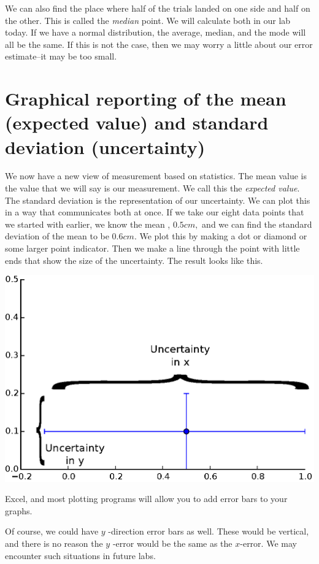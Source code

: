 \documentclass{book}%
\begin{document}
We can also find the place where half of the trials landed on one side and
half on the other. This is called the \emph{median} point. We will calculate
both in our lab today. If we have a normal distribution, the average,
median, and the mode will all be the same. If this is not the case, then we
may worry a little about our error estimate--it may be too small.

\section{Graphical reporting of the mean (expected value) and standard
deviation (uncertainty)}

We now have a new view of measurement based on statistics. The mean value is
the value that we will say is our measurement. We call this the \emph{%
expected value}. The standard deviation is the representation of our
uncertainty. We can plot this in a way that communicates both at once. If we
take our eight data points that we started with earlier, we know the mean , $%
0.5\unit{cm},$ and we can find the standard deviation of the mean to be $0.6%
\unit{cm}.$ We plot this by making a dot or diamond or some larger point
indicator. Then we make a line through the point with little ends that show
the size of the uncertainty. The result looks like this.

\begin{center}
\includegraphics[scale=0.5]{Lab2_figs/error_bars.eps}
\end{center}

 Excel, and most plotting programs will allow you to
add error bars to your graphs.

Of course, we could have $y$
-direction error bars as well. These would be vertical, and there is no reason the $y$%
-error would be the same as the $x$-error. We may encounter such situations
in future labs.
\end{document}
